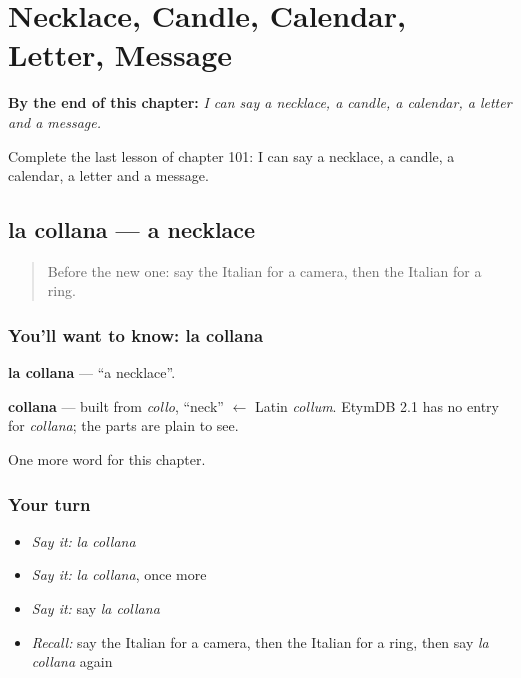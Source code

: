
\chapter{Necklace, Candle, Calendar, Letter, Message}
\label{ch:it-necklace-candle-calendar-letter-message}

\begin{chapteropening}
\textbf{By the end of this chapter:} \emph{I can say a necklace, a candle, a calendar, a letter and a message.}

Complete the last lesson of chapter 101: I can say a necklace, a candle, a calendar, a letter and a message.
\end{chapteropening}

\section[la collana]{la collana — a necklace}

\label{lesson:IT-C101-collana}



\begin{quote}
Before the new one: say the Italian for a camera, then the Italian for a ring.
\end{quote}

\subsection*{You'll want to know: la collana}
\textbf{la collana} — \textquotedblleft{}a necklace\textquotedblright{}.

\begin{cousinweb}
\textbf{collana} — built from \emph{collo}, \textquotedblleft{}neck\textquotedblright{} $\leftarrow$ Latin \emph{collum}. EtymDB 2.1 has no entry for \emph{collana}; the parts are plain to see.
\end{cousinweb}

\begin{grammarlens}[title={What you've built}]
One more word for this chapter.
\end{grammarlens}

\subsection*{Your turn}
\begin{itemize}
\raggedright
  \item \emph{Say it:} \emph{la collana}
  \item \emph{Say it:} \emph{la collana}, once more
  \item \emph{Say it:} say \emph{la collana}
  \item \emph{Recall:} say the Italian for a camera, then the Italian for a ring, then say \emph{la collana} again
\end{itemize}

